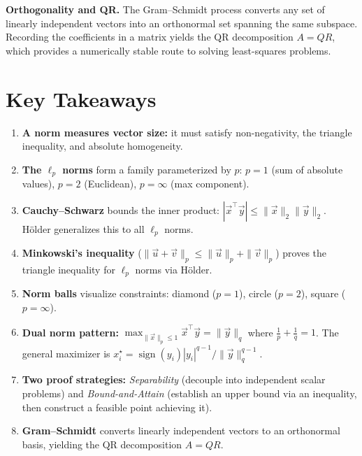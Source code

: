 \documentclass[10pt, twocolumn]{article}
\theoremstyle{definition}
\theoremstyle{plain}
\DeclareMathOperator{\sign}{sign}
\begin{document}
\textbf{Orthogonality and QR.} The Gram--Schmidt process converts any set of linearly independent vectors into an orthonormal set spanning the same subspace. Recording the coefficients in a matrix yields the QR decomposition $A = QR$, which provides a numerically stable route to solving least-squares problems.


\vfill

\section*{Key Takeaways}

\begin{enumerate}
    \item \textbf{A norm measures vector size:} it must satisfy non-negativity, the triangle inequality, and absolute homogeneity.
    \item \textbf{The $\ell_p$ norms} form a family parameterized by $p$: $p=1$ (sum of absolute values), $p=2$ (Euclidean), $p=\infty$ (max component).
    \item \textbf{Cauchy--Schwarz} bounds the inner product: $|\vec{x}^\top \vec{y}| \le \|\vec{x}\|_2 \|\vec{y}\|_2$. H\"{o}lder generalizes this to all $\ell_p$ norms.
    \item \textbf{Minkowski's inequality} ($\|\vec{u}+\vec{v}\|_p \le \|\vec{u}\|_p + \|\vec{v}\|_p$) proves the triangle inequality for $\ell_p$ norms via H\"{o}lder.
    \item \textbf{Norm balls} visualize constraints: diamond ($p=1$), circle ($p=2$), square ($p=\infty$).
    \item \textbf{Dual norm pattern:} $\max_{\|\vec{x}\|_p \le 1} \vec{x}^\top \vec{y} = \|\vec{y}\|_q$ where $\frac{1}{p} + \frac{1}{q} = 1$. The general maximizer is $x_i^\star = \sign(y_i)|y_i|^{q-1}/\|\vec{y}\|_q^{q-1}$.
    \item \textbf{Two proof strategies:} \emph{Separability} (decouple into independent scalar problems) and \emph{Bound-and-Attain} (establish an upper bound via an inequality, then construct a feasible point achieving it).
    \item \textbf{Gram--Schmidt} converts linearly independent vectors to an orthonormal basis, yielding the QR decomposition $A = QR$.
\end{enumerate}
\end{document}
